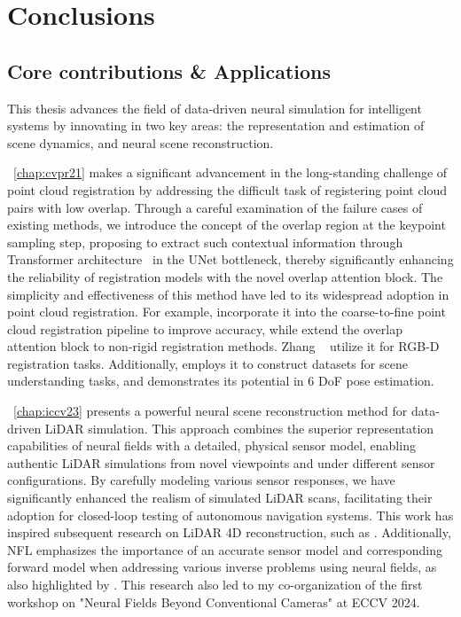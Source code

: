 \chapter{Conclusions}
\label{chap:conclusion}

\section{Core contributions \& Applications}
This thesis advances the field of data-driven neural simulation for intelligent systems by innovating in two key areas: the representation and estimation of scene dynamics, and neural scene reconstruction.

~\cref{chap:cvpr21} makes a significant advancement in the long-standing challenge of point cloud registration by addressing the difficult task of registering point cloud pairs with low overlap. Through a careful examination of the failure cases of existing methods, we introduce the concept of the overlap region at the keypoint sampling step, proposing to extract such contextual information through Transformer architecture~\cite{vaswani2017attention} in the UNet bottleneck, thereby significantly enhancing the reliability of registration models with the novel overlap attention block. The simplicity and effectiveness of this method have led to its widespread adoption in point cloud registration. For example, \cite{qin2023geotransformer,yu2021cofinet} incorporate it into the coarse-to-fine point cloud registration pipeline to improve accuracy, while \cite{attaiki2021dpfm,li2022lepard} extend the overlap attention block to non-rigid registration methods. Zhang \etal~\cite{zhang2022pcr} utilize it for RGB-D registration tasks. Additionally, \cite{delitzas2024scenefun3d} employs it to construct datasets for scene understanding tasks, and \cite{wen2024foundationpose} demonstrates its potential in 6 DoF pose estimation.

~\cref{chap:iccv23} presents a powerful neural scene reconstruction method for data-driven LiDAR simulation. This approach combines the superior representation capabilities of neural fields with a detailed, physical sensor model, enabling authentic LiDAR simulations from novel viewpoints and under different sensor configurations. By carefully modeling various sensor responses, we have significantly enhanced the realism of simulated LiDAR scans, facilitating their adoption for closed-loop testing of autonomous navigation systems. This work has inspired subsequent research on LiDAR 4D reconstruction, such as \cite{zheng2024lidar4d,zhong20243d}. Additionally, NFL emphasizes the importance of an accurate sensor model and corresponding forward model when addressing various inverse problems using neural fields, as also highlighted by \cite{ehret2024radar,klinghoffer2024platonerf}. This research also led to my co-organization of the first workshop on "Neural Fields Beyond Conventional Cameras" at ECCV 2024.

